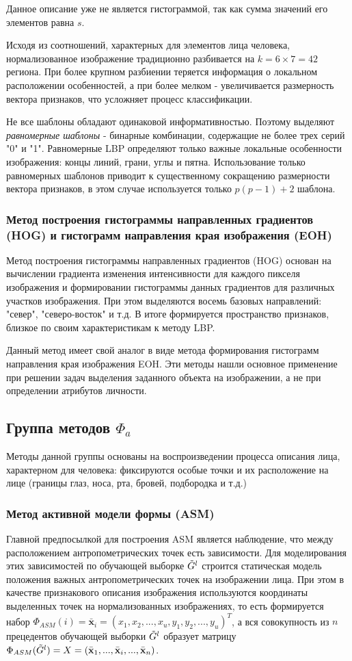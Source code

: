 \documentclass[12pt,a4paper]{article}
\begin{document}
Данное описание уже не является гистограммой, так как сумма значений его элементов равна $s$.

Исходя из соотношений, характерных для элементов лица человека, нормализованное изображение традиционно разбивается на $k=6\times7=42$ региона. При более крупном разбиении теряется информация о локальном расположении особенностей, а при более мелком - увеличивается размерность вектора признаков, что усложняет процесс классификации.

Не все шаблоны обладают одинаковой информативностью. Поэтому выделяют \textit{равномерные шаблоны} - бинарные комбинации, содержащие не более трех серий "0" и "1". Равномерные LBP определяют только важные локальные особенности изображения: концы линий, грани, углы и пятна. Использование только равномерных шаблонов приводит к существенному сокращению размерности вектора признаков, в этом случае используется только $p(p-1)+2$ шаблона.

\subsubsection{Метод построения гистограммы направленных градиентов (HOG) и гистограмм направления края изображения (EOH)}
Метод построения гистограммы направленных градиентов (HOG) основан на вычислении градиента изменения интенсивности для каждого пикселя изображения и формировании гистограммы данных градиентов для различных участков изображения. При этом выделяются восемь базовых направлений: "север", "северо-восток" и т.д. В итоге формируется пространство признаков, близкое по своим характеристикам к методу LBP.

Данный метод имеет свой аналог в виде метода формирования гистограмм направления края изображения EOH. Эти методы нашли основное применение при решении задач выделения заданного объекта на изображении, а не при определении атрибутов личности.

\subsection{Группа методов $\Phi_a$}
Методы данной группы основаны на воспроизведении процесса описания лица, характерном для человека: фиксируются особые точки и их расположение на лице (границы глаз, носа, рта, бровей, подбородка и т.д.)

\subsubsection{Метод активной модели формы (ASM)}
Главной предпосылкой для построения ASM является наблюдение, что между расположением антропометрических точек есть зависимости. Для моделирования этих зависимостей по обучающей выборке $\Tilde{G}^l$ строится статическая модель положения важных антропометрических точек на изображении лица. При этом в качестве признакового описания изображения используются координаты выделенных точек на нормализованных изображениях, то есть формируется набор $\Phi_{ASM}(i)=\bar{\textbf{x}}_i=(x_1,x_2,...,x_u,y_1,y_2,...,y_u)^T$, а вся совокупность из $n$ прецедентов обучающей выборки $\Tilde{G}^l$ образует матрицу $\Phi_{ASM}(\Tilde{G}^l)=X=(\bar{\textbf{x}}_1,...,\bar{\textbf{x}}_i,...,\bar{\textbf{x}}_n)$.
\end{document}
